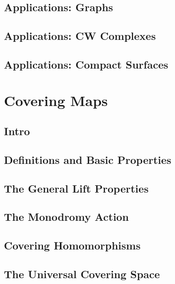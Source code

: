 \subsection{Applications: Graphs}
\label{subsection-applications-graphs}

\subsection{Applications: CW Complexes}
\label{subsection-applications-cw-complexes}

\subsection{Applications: Compact Surfaces}
\label{subsection-applications-compact-surfaces}

\section{Covering Maps}
\label{section-covering-maps}

\subsection{Intro}
\label{subsection-covering-maps-intro}

\subsection{Definitions and Basic Properties}
\label{subsection-covering-maps-definitions-and-basic-properties}

\subsection{The General Lift Properties}
\label{subsection-the-general-lift-properties}

\subsection{The Monodromy Action}
\label{subsection-the-monodromy-action}

\subsection{Covering Homomorphisms}
\label{subsection-covering-homomorphisms}

\subsection{The Universal Covering Space}
\label{subsection-the-universal-covering-space}

